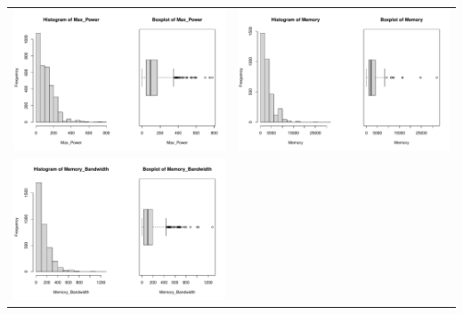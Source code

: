 \documentclass[a4paper]{article}
\theoremstyle{definition}
\begin{document}
\begin{center}
\begin{adjustbox}{width=\textwidth}
    \begin{tabular}{cc}
        \includegraphics[keepaspectratio, width=1\textwidth, height=1\textheight]{Visualization/Rplot_3.pdf}
        &\includegraphics[keepaspectratio, width=1\textwidth, height=1\textheight]{Visualization/Rplot_4.pdf}\\
        \includegraphics[keepaspectratio, width=1\textwidth, height=1\textheight]{Visualization/Rplot_5.pdf}

\end{tabular}
\end{adjustbox}
\end{center}
\end{document}
